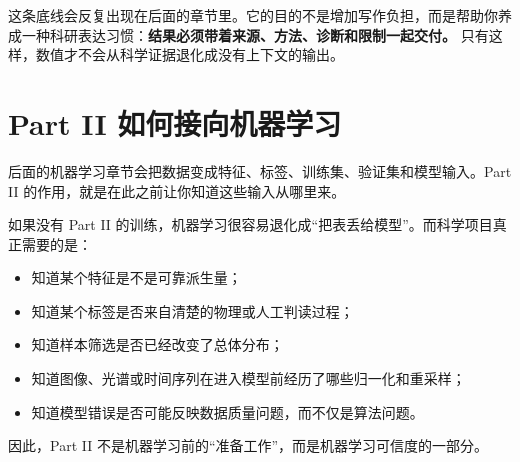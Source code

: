 这条底线会反复出现在后面的章节里。它的目的不是增加写作负担，而是帮助你养成一种科研表达习惯：\textbf{结果必须带着来源、方法、诊断和限制一起交付。} 只有这样，数值才不会从科学证据退化成没有上下文的输出。

\section*{Part II 如何接向机器学习}

后面的机器学习章节会把数据变成特征、标签、训练集、验证集和模型输入。Part II 的作用，就是在此之前让你知道这些输入从哪里来。

如果没有 Part II 的训练，机器学习很容易退化成“把表丢给模型”。而科学项目真正需要的是：

\begin{itemize}
    \item 知道某个特征是不是可靠派生量；
    \item 知道某个标签是否来自清楚的物理或人工判读过程；
    \item 知道样本筛选是否已经改变了总体分布；
    \item 知道图像、光谱或时间序列在进入模型前经历了哪些归一化和重采样；
    \item 知道模型错误是否可能反映数据质量问题，而不仅是算法问题。
\end{itemize}

因此，Part II 不是机器学习前的“准备工作”，而是机器学习可信度的一部分。
